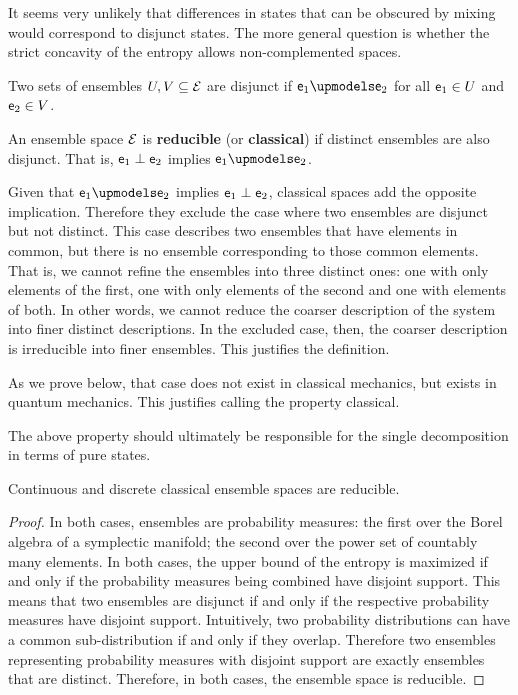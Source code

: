 \begin{remark}
	It seems very unlikely that differences in states that can be obscured by mixing would correspond to disjunct states. The more general question is whether the strict concavity of the entropy allows non-complemented spaces.
\end{remark}

\begin{defn}
	Two sets of ensembles $U, V \subseteq \mathcal{E}$ are disjunct if $\ens_1 \disjunct \ens_2$ for all $\mathsf{e}_1 \in U$ and $\mathsf{e}_2 \in V$. 
\end{defn}


\begin{defn}
	An ensemble space $\mathcal{E}$ is \textbf{reducible} (or \textbf{classical}) if distinct ensembles are also disjunct. That is, $\mathsf{e}_1 \perp \mathsf{e}_2$ implies $\ens_1 \disjunct \ens_2$.
\end{defn}

\begin{justification}
	Given that $\ens_1 \disjunct \ens_2$ implies $\mathsf{e}_1 \perp \mathsf{e}_2$, classical spaces add the opposite implication. Therefore they exclude the case where two ensembles are disjunct but not distinct. This case describes two ensembles that have elements in common, but there is no ensemble corresponding to those common elements. That is, we cannot refine the ensembles into three distinct ones: one with only elements of the first, one with only elements of the second and one with elements of both. In other words, we cannot reduce the coarser description of the system into finer distinct descriptions. In the excluded case, then, the coarser description is irreducible into finer ensembles. This justifies the definition.
	
	As we prove below, that case does not exist in classical mechanics, but exists in quantum mechanics. This justifies calling the property classical.
\end{justification}

\begin{remark}
	The above property should ultimately be responsible for the single decomposition in terms of pure states.
\end{remark}

\begin{prop}
	Continuous and discrete classical ensemble spaces are reducible.
\end{prop}

\begin{proof}
	In both cases, ensembles are probability measures: the first over the Borel algebra of a symplectic manifold; the second over the power set of countably many elements. In both cases, the upper bound of the entropy is maximized if and only if the probability measures being combined have disjoint support. This means that two ensembles are disjunct if and only if the respective probability measures have disjoint support. Intuitively, two probability distributions can have a common sub-distribution if and only if they overlap. Therefore two ensembles representing probability measures with disjoint support are exactly ensembles that are distinct. Therefore, in both cases, the ensemble space is reducible.
\end{proof}


